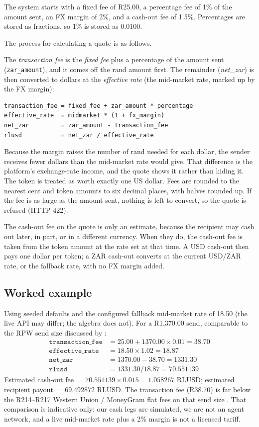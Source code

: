 \documentclass[11pt]{article}
\begin{document}
The system starts with a fixed fee of R25.00, a percentage fee of 1\% of the amount sent, an FX margin of 2\%, and a cash-out fee of 1.5\%. Percentages are stored as fractions, so 1\% is stored as 0.0100.

The process for calculating a quote is as follows.

The \emph{transaction fee} is the \emph{fixed fee} plus a percentage of the amount sent (\texttt{zar\_amount}), and it comes off the rand amount first. The remainder (\emph{net\_zar}) is then converted to dollars at the \emph{effective rate} (the mid-market rate, marked up by the FX margin):
\begin{verbatim}
transaction_fee = fixed_fee + zar_amount * percentage
effective_rate  = midmarket * (1 + fx_margin)
net_zar         = zar_amount - transaction_fee
rlusd           = net_zar / effective_rate
\end{verbatim}
Because the margin raises the number of rand needed for each dollar, the sender receives fewer dollars than the mid-market rate would give. That difference is the platform's exchange-rate income, and the quote shows it rather than hiding it. The token is treated as worth exactly one US dollar. Fees are rounded to the nearest cent and token amounts to six decimal places, with halves rounded up. If the fee is as large as the amount sent, nothing is left to convert, so the quote is refused (HTTP 422).

The cash-out fee on the quote is only an estimate, because the recipient may cash out later, in part, or in a different currency. When they do, the cash-out fee is taken from the token amount at the rate set at that time. A USD cash-out then pays one dollar per token; a ZAR cash-out converts at the current USD/ZAR rate, or the fallback rate, with no FX margin added.

\subsection{Worked example}
Using seeded defaults and the configured fallback mid-market rate of 18.50 (the live API may differ; the algebra does not). For a R1{,}370.00 send, comparable to the RPW send size discussed by \citet{Rateweb2026}:
\begin{align*}
\texttt{transaction\_fee} &= 25.00 + 1370.00\times 0.01 = 38.70 \\
\texttt{effective\_rate} &= 18.50\times 1.02 = 18.87 \\
\texttt{net\_zar} &= 1370.00 - 38.70 = 1331.30 \\
\texttt{rlusd} &= 1331.30 / 18.87 = 70.551139
\end{align*}
Estimated cash-out fee $= 70.551139 \times 0.015 = 1.058267$ RLUSD; estimated recipient payout $= 69.492872$ RLUSD. The transaction fee (R38.70) is far below the R214--R217 Western Union / MoneyGram flat fees on that send size \citep{Rateweb2026}. That comparison is indicative only: our cash legs are simulated, we are not an agent network, and a live mid-market rate plus a 2\% margin is not a licensed tariff.
\end{document}
